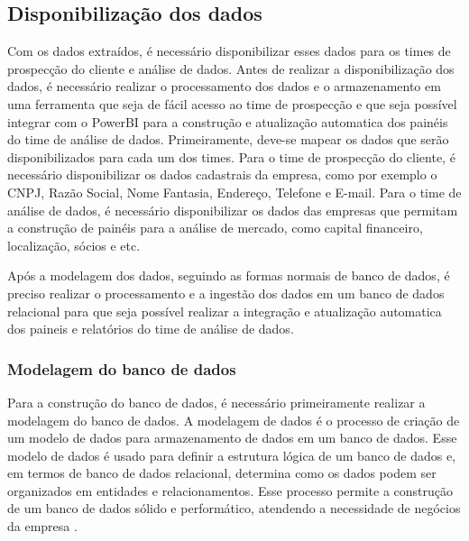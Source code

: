 \subsection{Disponibilização dos dados}

Com os dados extraídos, é necessário disponibilizar esses dados para os times de prospecção do cliente e análise de dados. Antes de realizar a disponibilização dos dados, é necessário realizar o processamento dos dados e o armazenamento em uma ferramenta que seja de fácil acesso ao time de prospecção e que seja possível integrar com o PowerBI para a construção e atualização automatica dos painéis do time de análise de dados. Primeiramente, deve-se mapear os dados que serão disponibilizados para cada um dos times. Para o time de prospecção do cliente, é necessário disponibilizar os dados cadastrais da empresa, como por exemplo o CNPJ, Razão Social, Nome Fantasia, Endereço, Telefone e E-mail. Para o time de análise de dados, é necessário disponibilizar os dados das empresas que permitam a construção de painéis para a análise de mercado, como capital financeiro, localização, sócios e etc.

Após a modelagem dos dados, seguindo as formas normais de banco de dados, é preciso realizar o processamento e a ingestão dos dados em um banco de dados relacional para que seja possível realizar a integração e atualização automatica dos paineis e relatórios do time de análise de dados.


\subsubsection{Modelagem do banco de dados}

Para a construção do banco de dados, é necessário primeiramente realizar a modelagem do banco de dados. A modelagem de dados é o processo de criação de um modelo de dados para armazenamento de dados em um banco de dados. Esse modelo de dados é usado para definir a estrutura lógica de um banco de dados e, em termos de banco de dados relacional, determina como os dados podem ser organizados em entidades e relacionamentos. Esse processo permite a construção de um banco de dados sólido e performático, atendendo a necessidade de negócios da empresa \cite{Golfarelli2003}.

